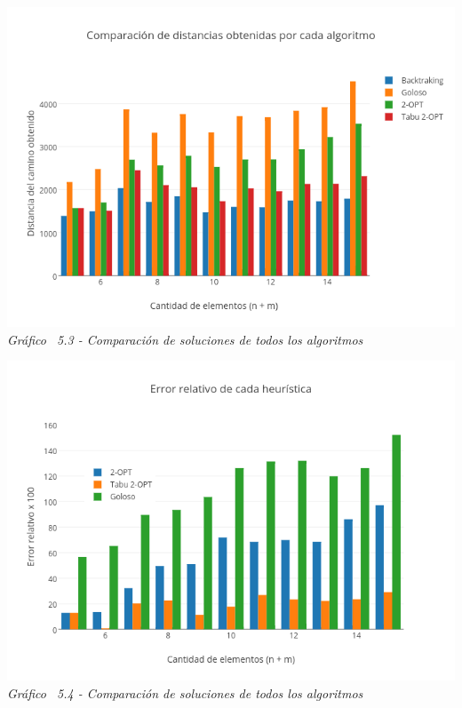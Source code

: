 \vspace*{0.3cm} \vspace*{0.3cm}
  \begin{center}
 \includegraphics[scale=0.5]{./EJ5/comparativo.png}\\
 {\textit{Gráfico \ 5.3 - Comparaci\'on de soluciones de todos los algoritmos}}
  \end{center}
  \vspace*{0.3cm}
  
  \vspace*{0.3cm} \vspace*{0.3cm}
  \begin{center}
 \includegraphics[scale=0.5]{./EJ5/errorChico.png}\\
 {\textit{Gráfico \ 5.4 - Comparaci\'on de soluciones de todos los algoritmos}}
  \end{center}
  \vspace*{0.3cm}

